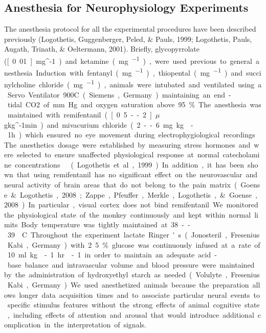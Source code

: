 \subsection{Anesthesia for Neurophysiology Experiments}
The anesthesia protocol for all the experimental procedures have been described previously (Logothetis, Guggenberger, Peled, \& Pauls, 1999; Logothetis, Pauls, Augath, Trinath, \& Oeltermann, 2001).
Briefly, glycopyrrolate (\unit[0.01]{mg^{-1}}) and ketamine (\unit[15]{mg^{-1}}), were used previous to general anesthesia.
Induction with fentanyl (\unit[3]{mg^{-1}}), thiopental (\unit[5]{mg^{-1}}) and succinylcholine chloride (\unit[3]{mg^{-1}}), animals were intubated and ventilated using a Servo Ventilator 900C (Siemens, Germany) maintaining an end-tidal CO2 of \unit[33--35]{mm Hg} and oxygen saturation above 95\%.
The anesthesia was maintained with remifentanil (\unit[0.5--2]{$\mu$g\dot{}kg{}^{-1}\dot{}min}) and mivacurium chloride (2--6 mg.kg{}-1h) which ensured no eye movement during electrophygiological recordings.
The anesthetics dosage were established by measuring stress hormones and were selected to ensure unaffected physiological response at normal catecholamine concentrations \ (Logothetis et al., 1999).
In addition, it has been shown that using remifentanil has no significant effect on the neurovascular and neural activity of brain areas that do not belong to the pain matrix (Goense \& Logothetis, 2008; Zappe, Pfeuffer, Merkle, Logothetis, \& Goense, 2008).
In particular, visual cortex does not bind remifentanil.
We monitored the physiological state of the monkey continuously and kept within normal limits.
Body temperature was tightly maintained at 38--39{\textdegree}C.
Throughout the experiment lactate Ringer's (Jonosteril, Fresenius Kabi, Germany) with 2.5\% glucose was continuously infused at a rate of 10 ml.kg{}-1.hr{}-1 in order to maintain an adequate acid-base balance and intravascular volume and blood pressure were maintained by the administration of hydroxyethyl starch as needed (Volulyte, Fresenius Kabi, Germany).


We used anesthetized animals because the preparation allows longer data acquisition times and to associate particular neural events to specific stimulus features without the strong effects of animal cognitive state, including effects of attention and arousal that would introduce additional complication in the interpretation of signals.

